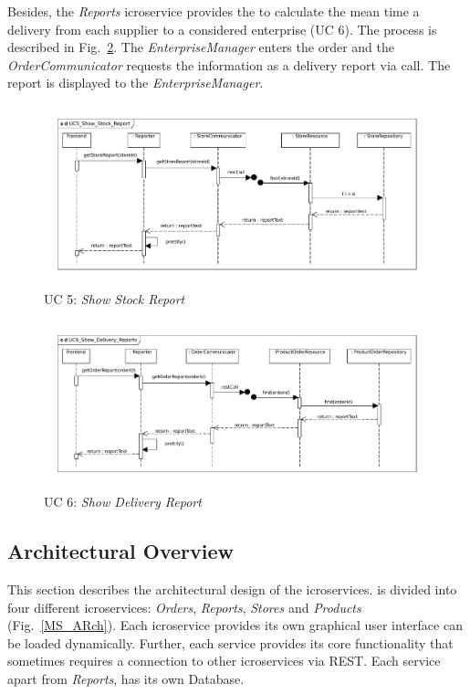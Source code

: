 		Besides, the \textit{Reports} icroservice provides the  to calculate the mean time a delivery  from each supplier to a considered enterprise (UC 6). 
		The process is described in Fig.~\ref{MS_UC6}. 
		The \textit{EnterpriseManager} enters the order  and the \textit{OrderCommunicator} requests the information as a delivery report via  call. 
		The report is displayed to the \textit{EnterpriseManager}.
		
	
			
			\begin{figure}[!h]
				\centering
				\includegraphics[width = 1\textwidth]{img/UC5_Show_Stock_Report.pdf}
				\caption{UC 5: \textit{Show Stock Report}}
				\label{MS_UC5}
			\end{figure}
			
			\begin{figure}[!h]
				\centering
				\includegraphics[width = 1\textwidth]{img/UC6_Show_Delivery_Reports.pdf}
				\caption{UC 6: \textit{Show Delivery Report}}
				\label{MS_UC6}
			\end{figure}
			
	\FloatBarrier
	\subsection{Architectural Overview}	\label{archiOverviewMicro}	
	This section describes the architectural design of the icroservices. 
	\CoCoME is divided into four different icroservices: \textit{Orders}, \textit{Reports}, \textit{Stores} and \textit{Products} (Fig.~\ref{MS_ARch}). 
	Each icroservice provides its own graphical user interface
	 can be loaded dynamically. 
	Further, each service provides its core functionality that sometimes requires a connection to other icroservices via REST. 
	Each service apart from \textit{Reports}, has its own Database.

